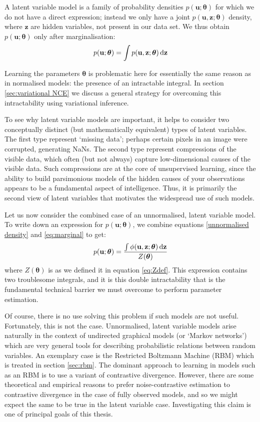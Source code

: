 \documentclass[11pt, oneside]{article}
\newcommand{\thetab}{{\boldsymbol{\theta}}}
\newcommand{\pnorm}{p}
\newcommand{\pnn}{\phi}
\renewcommand{\u}{{\mathbf u}}
\newcommand{\z}{{\mathbf z}}
\begin{document}
A latent variable model is a family of probability densities $\pnorm(\u; \thetab)$ for which we do not have a direct expression; instead we only have a joint $\pnorm(\u, \z; \thetab)$ density, where $\z$ are hidden variables, not present in our data set. We thus obtain $\pnorm(\u; \thetab)$ only after marginalisation:
\begin{align}
  \pnorm(\u; \thetab) = \int \pnorm(\u, \z;\thetab) \dif \z
  \label{eq:marginal}
\end{align}

Learning the parameters $\thetab$ is problematic here for essentially the same reason as in normalised models: the presence of an intractable integral. In section \ref{sec:variational NCE} we discuss a general strategy for overcoming this intractability using variational inference.

To see why latent variable models are important, it helps to consider two conceptually distinct (but mathematically equivalent) types of latent variables. The first type represent `missing data’; perhaps certain pixels in an image were corrupted, generating NaNs. The second type represent compressions of the visible data, which often (but not always) capture low-dimensional causes of the visible data. Such compressions are at the core of unsupervised learning, since the ability to build parsimonious models of the hidden causes of your observations appears to be a fundamental aspect of intelligence. Thus, it is primarily the second view of latent variables that motivates the widespread use of such models. 

Let us now consider the combined case of an unnormalised, latent variable model. To write down an expression for $\pnorm(\u; \thetab)$, we combine equations \ref{unnormalised density} and \ref{eq:marginal} to get:
\begin{align}
    \pnorm(\u; \thetab) = \frac{\int \pnn(\u, \z;\thetab) \dif \z}{Z(\thetab)}
\end{align}
where $Z(\thetab)$ is as we defined it in equation \ref{eq:Zdef}. This expression contains two troublesome integrals, and it is this double intractability that is the fundamental technical barrier we must overcome to perform parameter estimation.

Of course, there is no use solving this problem if such models are not useful. Fortunately, this is not the case. Unnormalised, latent variable models arise naturally in the context of undirected graphical models (or ‘Markov networks’) \citep{kindermann1980markov} which are very general tools for describing probabilistic relations between random variables. An exemplary case is the Restricted Boltzmann Machine (RBM) \citep{smolensky1986information} which is treated in section \ref{sec:rbm}. The dominant approach to learning in models such as an RBM is to use a variant of contrastive divergence. However, there are some theoretical and empirical reasons to prefer noise-contrastive estimation to contrastive divergence \citep{gutmann2012noise} in the case of fully observed models, and so we might expect the same to be true in the latent variable case. Investigating this claim is one of principal goals of this thesis.
\end{document}
